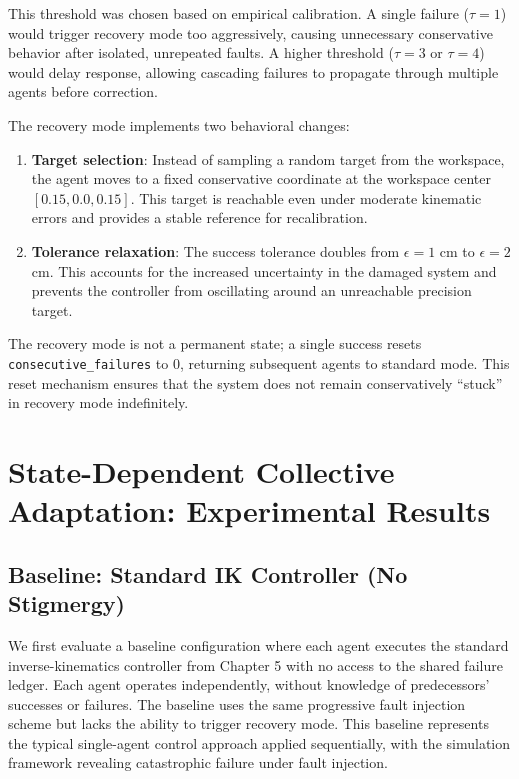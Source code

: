 \documentclass[12pt,a4paper,oneside]{report}
\begin{document}
This threshold was chosen based on empirical calibration. A single failure ($\tau = 1$) would trigger recovery mode too aggressively, causing unnecessary conservative behavior after isolated, unrepeated faults. A higher threshold ($\tau = 3$ or $\tau = 4$) would delay response, allowing cascading failures to propagate through multiple agents before correction.

The recovery mode implements two behavioral changes:
\begin{enumerate}
    \item \textbf{Target selection}: Instead of sampling a random target from the workspace, the agent moves to a fixed conservative coordinate at the workspace center $[0.15, 0.0, 0.15]$. This target is reachable even under moderate kinematic errors and provides a stable reference for recalibration.
    \item \textbf{Tolerance relaxation}: The success tolerance doubles from $\epsilon = 1$ cm to $\epsilon = 2$ cm. This accounts for the increased uncertainty in the damaged system and prevents the controller from oscillating around an unreachable precision target.
\end{enumerate}

The recovery mode is not a permanent state; a single success resets \texttt{consecutive\_failures} to 0, returning subsequent agents to standard mode. This reset mechanism ensures that the system does not remain conservatively ``stuck'' in recovery mode indefinitely.

\section{State-Dependent Collective Adaptation: Experimental Results}

\subsection{Baseline: Standard IK Controller (No Stigmergy)}

We first evaluate a baseline configuration where each agent executes the standard inverse-kinematics controller from Chapter 5 with no access to the shared failure ledger. Each agent operates independently, without knowledge of predecessors' successes or failures. The baseline uses the same progressive fault injection scheme but lacks the ability to trigger recovery mode. This baseline represents the typical single-agent control approach applied sequentially, with the simulation framework revealing catastrophic failure under fault injection.
\end{document}
